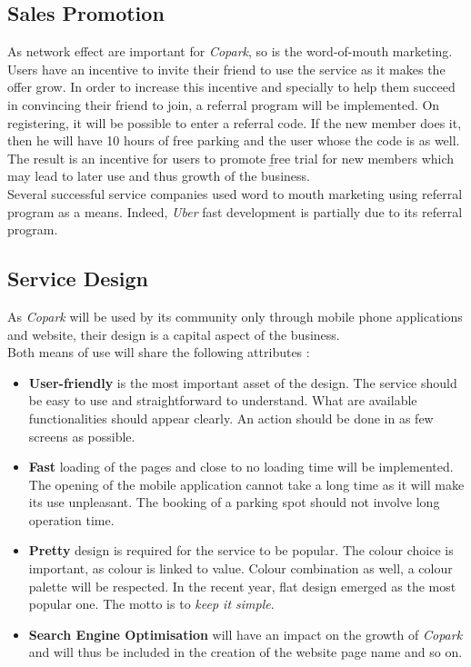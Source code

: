 \documentclass[12pt,a4paper,oneside]{book}
\newcommand{\bp}{\textit{Copark}}
\begin{document}
\subsection{Sales Promotion}
As network effect are important for \bp{}, so is the word-of-mouth marketing.\\

Users have an incentive to invite their friend to use the service as it makes the offer grow. In order to increase this incentive and specially to help them succeed in convincing their friend to join, a referral program will be implemented. On registering, it will be possible to enter a referral code. If the new member does it, then he will have 10 hours of free parking and the user whose the code is as well.\\

The result is an incentive for users to promote \b free trial for new members which may lead to later use and thus growth of the business.\\

Several successful service companies used word to mouth marketing using referral program as a means. Indeed, \textit{Uber} fast development is partially due to its referral program.\cite{uberef}

\subsection{Service Design}
As \bp{} will be used by its community only through mobile phone applications and website, their design is a capital aspect of the business.\\

Both means of use will share the following attributes :
\begin{itemize}
\item \textbf{User-friendly} is the most important asset of the design. The service should be easy to use and straightforward to understand. What are available functionalities should appear clearly. An action should be done in as few screens as possible.
\item \textbf{Fast} loading of the pages and close to no loading time will be implemented. The opening of the mobile application cannot take a long time as it will make its use unpleasant. The booking of a parking spot should not involve long operation time.
\item \textbf{Pretty} design is required for the service to be popular. The colour choice is important, as colour is linked to value. Colour combination as well, a colour palette will be respected. In the recent year, flat design emerged as the most popular one. The motto is to \textit{keep it simple}.
\item \textbf{Search Engine Optimisation} will have an impact on the growth of \bp{} and will thus be included in the creation of the website page name and so on.
\end{itemize}
\end{document}
